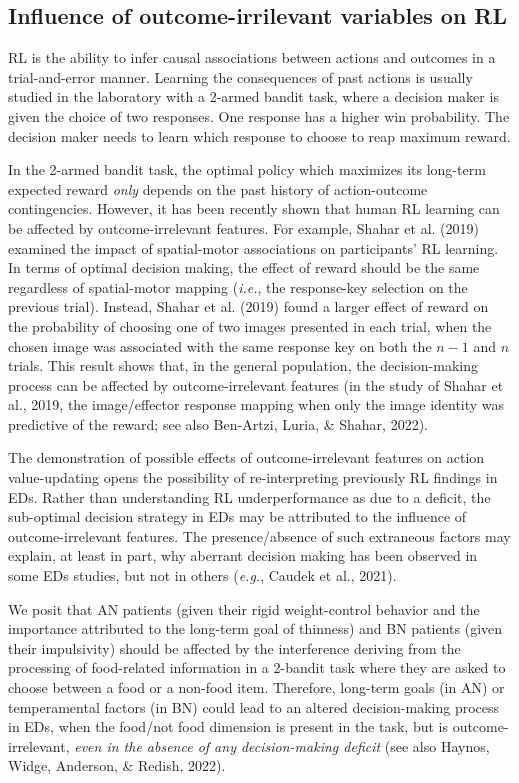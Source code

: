 \documentclass[
  man,floatsintext]{apa6}
\begin{document}
\hypertarget{influence-of-outcome-irrilevant-variables-on-rl}{%
\subsection{Influence of outcome-irrilevant variables on RL}\label{influence-of-outcome-irrilevant-variables-on-rl}}

RL is the ability to infer causal associations between actions and outcomes in a trial-and-error manner. Learning the consequences of past actions is usually studied in the laboratory with a 2-armed bandit task, where a decision maker is given the choice of two responses. One response has a higher win probability. The decision maker needs to learn which response to choose to reap maximum reward.

In the 2-armed bandit task, the optimal policy which maximizes its long-term expected reward \emph{only} depends on the past history of action-outcome contingencies. However, it has been recently shown that human RL learning can be affected by outcome-irrelevant features. For example, Shahar et al. (2019) examined the impact of spatial-motor associations on participants' RL learning. In terms of optimal decision making, the effect of reward should be the same regardless of spatial-motor mapping (\emph{i.e.}, the response-key selection on the previous trial). Instead, Shahar et al. (2019) found a larger effect of reward on the probability of choosing one of two images presented in each trial, when the chosen image was associated with the same response key on both the \(n - 1\) and \(n\) trials. This result shows that, in the general population, the decision-making process can be affected by outcome-irrelevant features (in the study of Shahar et al., 2019, the image/effector response mapping when only the image identity was predictive of the reward; see also Ben-Artzi, Luria, \& Shahar, 2022).

The demonstration of possible effects of outcome-irrelevant features on action value-updating opens the possibility of re-interpreting previously RL findings in EDs. Rather than understanding RL underperformance as due to a deficit, the sub-optimal decision strategy in EDs may be attributed to the influence of outcome-irrelevant features. The presence/absence of such extraneous factors may explain, at least in part, why aberrant decision making has been observed in some EDs studies, but not in others (\emph{e.g.}, Caudek et al., 2021).

We posit that AN patients (given their rigid weight-control behavior and the importance attributed to the long-term goal of thinness) and BN patients (given their impulsivity) should be affected by the interference deriving from the processing of food-related information in a 2-bandit task where they are asked to choose between a food or a non-food item. Therefore, long-term goals (in AN) or temperamental factors (in BN) could lead to an altered decision-making process in EDs, when the food/not food dimension is present in the task, but is outcome-irrelevant, \emph{even in the absence of any decision-making deficit} (see also Haynos, Widge, Anderson, \& Redish, 2022).
\end{document}
